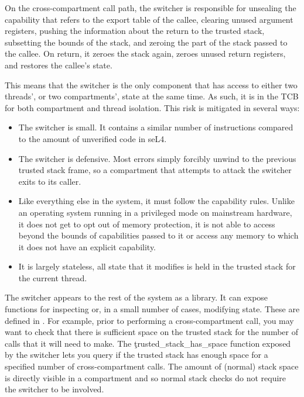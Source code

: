 On the cross-compartment call path, the switcher is responsible for unsealing the capability that refers to the export table of the callee, clearing unused argument registers, pushing the information about the return to the trusted stack, subsetting the bounds of the stack, and zeroing the part of the stack passed to the callee.
On return, it zeroes the stack again, zeroes unused return registers, and restores the callee's state.

This means that the switcher is the only component that has access to either two threads', or two compartments', state at the same time.
As such, it is in the TCB for both compartment and thread isolation.
This risk is mitigated in several ways:

\begin{itemize}
	\item{The switcher is small.
		It contains a similar number of instructions compared to the amount of unverified code in seL4.}
	\item{The switcher is defensive.
		Most errors simply forcibly unwind to the previous trusted stack frame, so a compartment that attempts to attack the switcher exits to its caller.}
	\item{Like everything else in the system, it must follow the capability rules.
		Unlike an operating system running in a privileged mode on mainstream hardware, it does not get to opt out of memory protection, it is not able to access beyond the bounds of capabilities passed to it or access any memory to which it does not have an explicit capability.}
	\item{It is largely stateless, all state that it modifies is held in the trusted stack for the current thread.}
\end{itemize}

The switcher appears to the rest of the system as a library.
It can expose functions for inspecting or, in a small number of cases, modifying state.
These are defined in .
For example, prior to performing a cross-compartment call, you may want to check that there is sufficient space on the trusted stack for the number of calls that it will need to make.
The \c{trusted_stack_has_space} function exposed by the switcher lets you query if the trusted stack has enough space for a specified number of cross-compartment calls.
The amount of (normal) stack space is directly visible in a compartment and so normal stack checks do not require the switcher to be involved.


